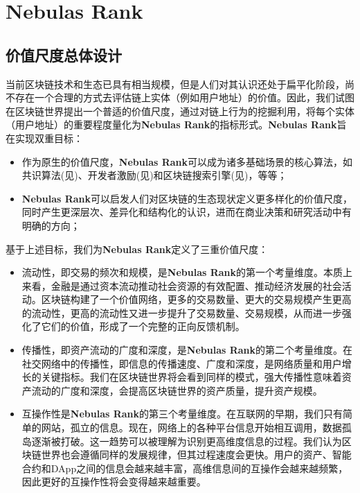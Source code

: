 \section{Nebulas Rank}
\label{sec:rank}

\subsection{价值尺度总体设计} \label{subsec:value}
当前区块链技术和生态已具有相当规模，但是人们对其认识还处于扁平化阶段，尚不存在一个合理的方式去评估链上实体（例如用户地址）的价值。因此，我们试图在区块链世界提出⼀个普适的价值尺度，通过对链上行为的挖掘利用，将每个实体（用户地址）的重要程度量化为\textbf{Nebulas Rank}的指标形式。\textbf{Nebulas Rank}旨在实现双重目标：
\begin{itemize}
	\item 作为原生的价值尺度，\textbf{Nebulas Rank}可以成为诸多基础场景的核心算法，如共识算法(见)、开发者激励(见)和区块链搜索引擎(见)，等等；
	\item \textbf{Nebulas Rank}可以启发人们对区块链的生态现状定义更多样化的价值尺度，同时产生更深层次、差异化和结构化的认识，进而在商业决策和研究活动中有明确的方向；
\end{itemize}
基于上述目标，我们为\textbf{Nebulas Rank}定义了三重价值尺度：
\begin{itemize}
	\item 流动性，即交易的频次和规模，是\textbf{Nebulas Rank}的第⼀个考量维度。本质上来看，⾦融是通过资本流动推动社会资源的有效配置、推动经济发展的社会活动。区块链构建了⼀个价值⽹络，更多的交易数量、更⼤的交易规模产⽣更⾼的流动性，更⾼的流动性⼜进⼀步提升了交易数量、交易规模，从⽽进⼀步强化了它们的价值，形成了⼀个完整的正向反馈机制。 
	\item 传播性，即资产流动的⼴度和深度，是\textbf{Nebulas Rank}的第⼆个考量维度。在社交网络中的传播性，即信息的传播速度、⼴度和深度，是⽹络质量和⽤户增长的关键指标。我们在区块链世界将会看到同样的模式，强⼤传播性意味着资产流动的⼴度和深度，会提⾼区块链世界的资产质量，提升资产规模。
	\item 互操作性是\textbf{Nebulas Rank}的第三个考量维度。在互联⽹的早期，我们只有简单的⽹站，孤⽴的信息。现在，⽹络上的各种平台信息开始相互调⽤，数据孤岛逐渐被打破。这⼀趋势可以被理解为识别更⾼维度信息的过程。我们认为区块链世界也会遵循同样的发展规律，但其过程速度会更快。⽤户的资产、智能合约和DApp之间的信息会越来越丰富，⾼维信息间的互操作会越来越频繁，因此更好的互操作性将会变得越来越重要。 
\end{itemize}

